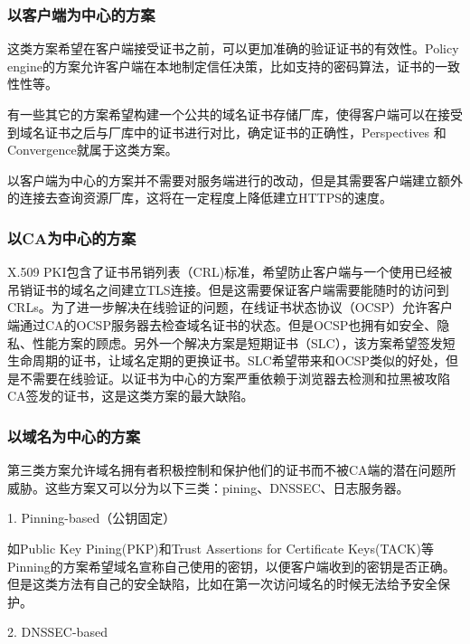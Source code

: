 \subsubsection{以客户端为中心的方案}

这类方案希望在客户端接受证书之前，可以更加准确的验证证书的有效性。Policy engine\supercite{abadi2013global}的方案允许客户端在本地制定信任决策，比如支持的密码算法，证书的一致性性等。

有一些其它的方案希望构建一个公共的域名证书存储厂库，使得客户端可以在接受到域名证书之后与厂库中的证书进行对比，确定证书的正确性，Perspectives\supercite{wendlandt2008perspectives} 和 Convergence\supercite{convergence}就属于这类方案。

以客户端为中心的方案并不需要对服务端进行的改动，但是其需要客户端建立额外的连接去查询资源厂库，这将在一定程度上降低建立HTTPS的速度。


\subsubsection{以CA为中心的方案}

X.509 PKI包含了证书吊销列表（CRL)标准\supercite{cooper2008internet}，希望防止客户端与一个使用已经被吊销证书的域名之间建立TLS连接。但是这需要保证客户端需要能随时的访问到CRLs。为了进一步解决在线验证的问题，在线证书状态协议（OCSP）\supercite{myers1999x}允许客户端通过CA的OCSP服务器去检查域名证书的状态。但是OCSP也拥有如安全、隐私、性能方案的顾虑。另外一个解决方案是短期证书（SLC）\supercite{topalovic2012towards}，该方案希望签发短生命周期的证书，让域名定期的更换证书。SLC希望带来和OCSP类似的好处，但是不需要在线验证。以证书为中心的方案严重依赖于浏览器去检测和拉黑被攻陷CA签发的证书，这是这类方案的最大缺陷。


\subsubsection{以域名为中心的方案}


第三类方案允许域名拥有者积极控制和保护他们的证书而不被CA端的潜在问题所威胁。这些方案又可以分为以下三类：pining、DNSSEC、日志服务器。

1. Pinning-based（公钥固定）

如Public Key Pining(PKP)\supercite{evans2015public}和Trust Assertions for Certificate Keys(TACK)\supercite{topalovic2012towards}等Pinning的方案希望域名宣称自己使用的密钥，以便客户端收到的密钥是否正确。但是这类方法有自己的安全缺陷，比如在第一次访问域名的时候无法给予安全保护。

2. DNSSEC-based

